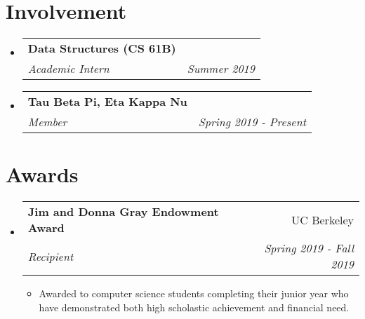 \documentclass[letterpaper,11pt]{article}
\makeatletter
\newcommand{\resumeItem}[2]{
  \item\small{
    \textbf{#1}{: #2 \vspace{-2pt}}
  }
}
\newcommand{\resumeSubheading}[4]{
  \vspace{-1pt}\item
    \begin{tabular*}{0.97\textwidth}[t]{l@{\extracolsep{\fill}}r}
      \textbf{#1} & #2 \\
      \textit{\small#3} & \textit{\small #4} \\
    \end{tabular*}\vspace{-5pt}
}
\newcommand{\resumeSubHeadingListStart}{\begin{itemize}[leftmargin=*]}
\newcommand{\resumeSubHeadingListEnd}{\end{itemize}}
\newcommand{\resumeItemListStart}{\begin{itemize}}
\newcommand{\resumeItemListEnd}{\end{itemize}\vspace{-5pt}}
\newcommand{\resumeItemD}[1]{
  \item\small{
    #1 \vspace{-2pt}
  }
}
\makeatother
\begin{document}
\section{Involvement}
  \resumeSubHeadingListStart
    \resumeSubheading
      {Data Structures (CS 61B)}{}
      {Academic Intern}{Summer 2019}
    \resumeSubheading
      {Tau Beta Pi, Eta Kappa Nu}{}
      {Member}{Spring 2019 - Present}
  \resumeSubHeadingListEnd


\section{Awards}
  \resumeSubHeadingListStart
    \resumeSubheading
      {Jim and Donna Gray Endowment Award}{UC Berkeley}
      {Recipient}{Spring 2019 - Fall 2019}
      \resumeItemListStart
        \resumeItemD
          {Awarded to computer science students completing their junior year who have demonstrated both high scholastic achievement and financial need.}
      \resumeItemListEnd
  \resumeSubHeadingListEnd


\end{document}
